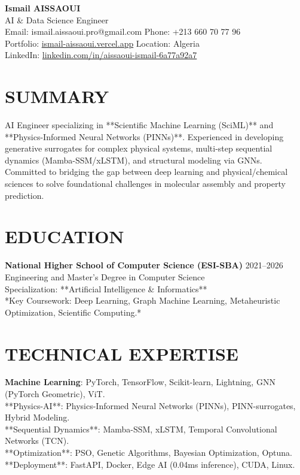 \documentclass[a4paper,11pt]{article}
\begin{document}
\begin{center}
    {\Huge\bfseries\color{titleblue} Ismail AISSAOUI}\\[4pt]
    {\Large AI \& Data Science Engineer}\\[6pt]
    Email: ismail.aissaoui.pro@gmail.com \quad Phone: +213 660 70 77 96 \\
    Portfolio: \href{https://ismail-aissaoui.vercel.app}{ismail-aissaoui.vercel.app} \quad Location: Algeria \\
    LinkedIn: \href{https://linkedin.com/in/aissaoui-ismail-6a77a92a7}{linkedin.com/in/aissaoui-ismail-6a77a92a7}
\end{center}

\section{SUMMARY}
AI Engineer specializing in **Scientific Machine Learning (SciML)** and **Physics-Informed Neural Networks (PINNs)**. Experienced in developing generative surrogates for complex physical systems, multi-step sequential dynamics (Mamba-SSM/xLSTM), and structural modeling via GNNs. Committed to bridging the gap between deep learning and physical/chemical sciences to solve foundational challenges in molecular assembly and property prediction.

\section{EDUCATION}
\textbf{National Higher School of Computer Science (ESI-SBA)} \hfill 2021--2026 \\
Engineering and Master’s Degree in Computer Science \\
Specialization: **Artificial Intelligence \& Informatics** \\
*Key Coursework: Deep Learning, Graph Machine Learning, Metaheuristic Optimization, Scientific Computing.*

\section{TECHNICAL EXPERTISE}
\textbf{Machine Learning}: PyTorch, TensorFlow, Scikit-learn, Lightning, GNN (PyTorch Geometric), ViT. \\
**Physics-AI**: Physics-Informed Neural Networks (PINNs), PINN-surrogates, Hybrid Modeling. \\
**Sequential Dynamics**: Mamba-SSM, xLSTM, Temporal Convolutional Networks (TCN). \\
**Optimization**: PSO, Genetic Algorithms, Bayesian Optimization, Optuna. \\
**Deployment**: FastAPI, Docker, Edge AI (0.04ms inference), CUDA, Linux.
\end{document}
